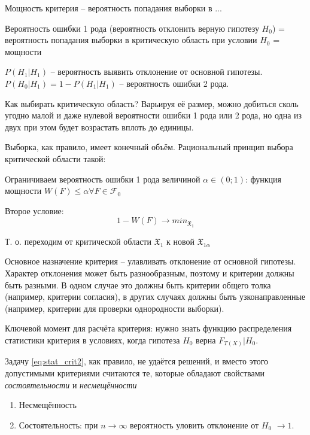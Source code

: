 \documentclass[main.tex]{subfiles}
\begin{document}
Мощность критерия -- вероятность попадания выборки в ...

Вероятность ошибки 1 рода (вероятность отклонить верную гипотезу $ H_0 $) = вероятность попадания выборки в критическую область при условии $ H_0 $ = мощности %

$ P(H_1 | H_1) $ -- вероятность выявить отклонение от основной гипотезы. $ P(H_0 | H_1) = 1 - P(H_1 | H_1) $ -- вероятность ошибки 2 рода.

Как выбирать критическую область? Варьируя её размер, можно добиться сколь угодно малой и даже нулевой вероятности ошибки 1 рода или 2 рода, но одна из двух при этом будет возрастать вплоть до единицы.

Выборка, как правило, имеет конечный объём. Рациональный принцип выбора критической области такой:

Ограничиваем вероятность ошибки 1 рода величиной $ \alpha \in (0;1) $:
функция мощности $ W(F) \le \alpha \forall F \in \mathcal{F}_0 $

Второе условие: 
\begin{equation} \label{eq:stat_crit2}
	1 - W(F) \to min_{\mathfrak{X}_1}
\end{equation} 

Т. о. переходим от критической области $ \mathfrak{X}_1 $ к новой $ \mathfrak{X}_{1\alpha} $

Основное назначение критерия -- улавливать отклонение от основной гипотезы. Характер отклонения может быть разнообразным, поэтому и критерии должны быть разными.
В одном случае это должны быть критерии общего толка (например, критерии согласия), в других случаях должны быть узконаправленные (например, критерии для проверки однородности выборки).


Ключевой момент для расчёта критерия: нужно знать функцию распределения статистики критерия в условиях, когда гипотеза $ H_0 $ верна $ F_{T(X)} | H_0 $.

Задачу \ref{eq:stat_crit2}, как правило, не удаётся решений, и вместо этого допустимыми критериями считаются те, которые обладают свойствами \emph{состоятельности} и \emph{несмещённости}

\begin{enumerate}[noitemsep]
	\item Несмещённость
	\item Состоятельность: при $ n \to \infty $ вероятность уловить отклонение от $ H_0 $ $ \to 1 $.
\end{enumerate}
\end{document}
